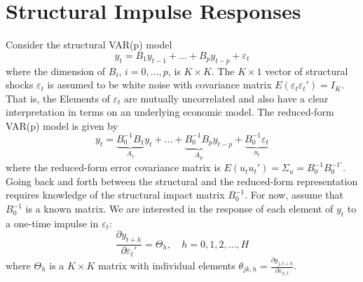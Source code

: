 \documentclass[a4paper]{scrartcl}
\begin{document}
\section{Structural Impulse Responses}
Consider the structural VAR(p) model $$y_t = B_1 y_{t-1} + ... + B_{p} y_{t-p} + \varepsilon_{t}$$
where the dimension of $B_i$, $i = 0,...,p$, is $K \times K$. The $K \times 1$ vector of structural shocks $\varepsilon_{t}$ is assumed to be white noise with covariance matrix $E(\varepsilon_t \varepsilon_t') = I_K$. That is, the Elements of $\varepsilon_t$ are mutually uncorrelated and also have a clear interpretation in terms on an underlying economic model. The reduced-form VAR(p) model is given by
$$y_t = \underbrace{B_0^{-1}B_1}_{A_1}y_t + ... + \underbrace{B_0^{-1}B_p}_{A_p} y_{t-p} + \underbrace{B_0^{-1}\varepsilon_t}_{u_t}$$
where the reduced-form error covariance matrix is $E(u_t u_t')=\Sigma_u = B_0^{-1}B_0^{-1'}$. Going back and forth between the structural and the reduced-form representation requires knowledge of the structural impact matrix $B_0^{-1}$. For now, assume that $B_0^{-1}$ is a known matrix. We are interested in the response of each element of $y_t$ to a one-time impulse in $\varepsilon_{t}$:
$$\frac{\partial y_{t+h}}{\partial \varepsilon_{t}'} = \Theta_h, \quad h=0,1,2,...,H$$
where $\Theta_h$ is a $K\times K$ matrix with individual elements $\theta_{jk,h}=\frac{\partial y_{j,t+h}}{\partial \varepsilon_{k,t}}$.
\end{document}
